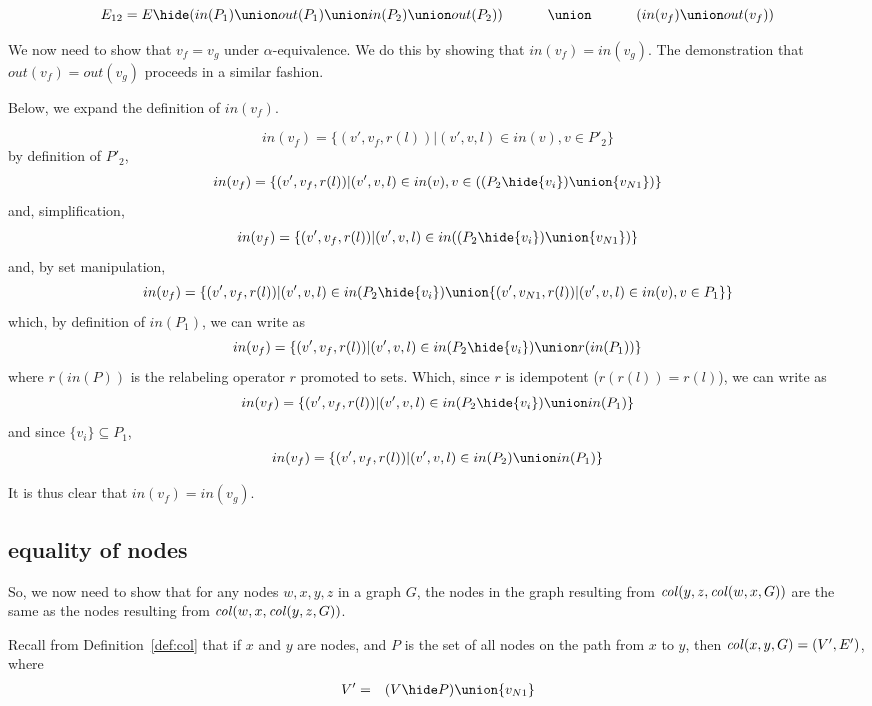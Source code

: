 \[
E_{12}  =  
   E\hide
  (
    in(P_1) \union out(P_1) \union in(P_2) \union out(P_2)
  ) \\
   \hphantom{E_{12}  = \;\;}   \union\ \\
\hphantom{E_{12}  = \;\;}   (in(v_f) \union out(v_f))\\ 
\]


We now need to show that $v_f=v_g$ under $\alpha$-equivalence. We do this by showing that $in(v_f)=in(v_g)$. The demonstration that $out(v_f)=out(v_g)$ proceeds in a similar fashion. 

Below, we expand the definition of $in(v_f)$. 

\[
in(v_f) = \{(v',v_f,r(l))|(v',v,l) \in in(v), v\in P'_2\}
\]
\noindent
by definition of $P'_2$,
\[
in(v_f) = \{(v',v_f,r(l))|(v',v,l) \in in(v), v\in((P_2\hide\{v_i\})\union\{v_{N1}\})\}
\]
\noindent
and,  simplification, 
\[
in(v_f) = \{(v',v_f,r(l))|(v',v,l) \in in((P_2\hide\{v_i\}) \union \{v_{N1}\})\}
\]
\noindent
and, by set manipulation, 
\[
in(v_f) = \{(v',v_f,r(l))|(v',v,l) \in in(P_2\hide\{v_i\}) \union  \{(v',v_{N1},r(l))|(v',v,l)\in in(v), v\in P_1\}\}
\]
\noindent
which, by definition of $in(P_1)$, we can write as
\[
in(v_f) = \{(v',v_f,r(l))|(v',v,l) \in in(P_2\hide\{v_i\}) \union  r(in(P_1))\}
\]
\noindent
where $r(in(P))$ is the relabeling operator $r$ promoted to sets.  Which, since $r$ is idempotent ($r(r(l)) = r(l)$), we can write as
\[
in(v_f) = \{(v',v_f,r(l))|(v',v,l) \in in(P_2\hide\{v_i\}) \union  in(P_1)\}
\]
\noindent
and since $\{v_i\} \subseteq P_1$, 
\[
in(v_f) = \{(v',v_f,r(l))|(v',v,l) \in in(P_2) \union  in(P_1)\}
\]



It is thus clear that $in(v_f)=in(v_g)$. 


\subsection{equality of nodes}

 So,    we now need to show that for any nodes $w,x,y,z$ in a graph $G$, the nodes in the graph resulting from $\mathit{col}(y,z,\mathit{col}(w,x,G))$ are the same as the nodes resulting from $\mathit{col}(w,x,\mathit{col}(y,z,G))$. 

Recall from Definition~\ref{def:col} that if $x$ and $y$ are nodes, and $P$ is the set of all nodes on the path from $x$ to $y$, then  $\mathit{col}(x,y,G) =  (V',E')$, where 
  \begin{eqnarray*}
  V' & = & (V\hide P) \union \{v_{N1}\}     \\
  \end{eqnarray*}



